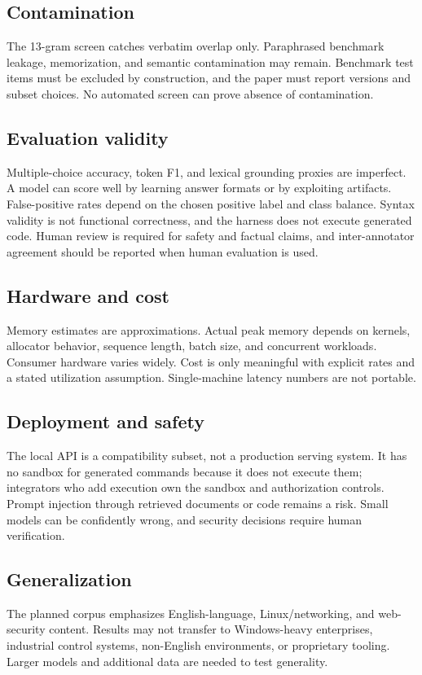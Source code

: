 \subsection{Contamination}

The 13-gram screen catches verbatim overlap only. Paraphrased benchmark leakage,
memorization, and semantic contamination may remain. Benchmark test items must be
excluded by construction, and the paper must report versions and subset choices.
No automated screen can prove absence of contamination.

\subsection{Evaluation validity}

Multiple-choice accuracy, token F1, and lexical grounding proxies are imperfect.
A model can score well by learning answer formats or by exploiting artifacts.
False-positive rates depend on the chosen positive label and class balance.
Syntax validity is not functional correctness, and the harness does not execute
generated code. Human review is required for safety and factual claims, and
inter-annotator agreement should be reported when human evaluation is used.

\subsection{Hardware and cost}

Memory estimates are approximations. Actual peak memory depends on kernels,
allocator behavior, sequence length, batch size, and concurrent workloads.
Consumer hardware varies widely. Cost is only meaningful with explicit rates and
a stated utilization assumption. Single-machine latency numbers are not portable.

\subsection{Deployment and safety}

The local API is a compatibility subset, not a production serving system. It has
no sandbox for generated commands because it does not execute them; integrators
who add execution own the sandbox and authorization controls. Prompt injection
through retrieved documents or code remains a risk. Small models can be
confidently wrong, and security decisions require human verification.

\subsection{Generalization}

The planned corpus emphasizes English-language, Linux/networking, and
web-security content. Results may not transfer to Windows-heavy enterprises,
industrial control systems, non-English environments, or proprietary tooling.
Larger models and additional data are needed to test generality.
